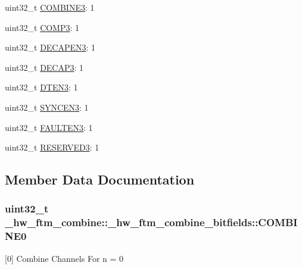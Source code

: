 \begin{DoxyCompactItemize}
\item 
uint32\+\_\+t \hyperlink{struct__hw__ftm__combine_1_1__hw__ftm__combine__bitfields_a5ec6bd45771c59a9f9bb562f11bf3e75}{C\+O\+M\+B\+I\+N\+E3}\+: 1
\item 
uint32\+\_\+t \hyperlink{struct__hw__ftm__combine_1_1__hw__ftm__combine__bitfields_ae94a98e3493de7cfb1be6da6527b76a0}{C\+O\+M\+P3}\+: 1
\item 
uint32\+\_\+t \hyperlink{struct__hw__ftm__combine_1_1__hw__ftm__combine__bitfields_accb4bd86bf26f5b787f232e03f7a7bb3}{D\+E\+C\+A\+P\+E\+N3}\+: 1
\item 
uint32\+\_\+t \hyperlink{struct__hw__ftm__combine_1_1__hw__ftm__combine__bitfields_a8ead0c5999abcf05f3fc9fdc95f898d0}{D\+E\+C\+A\+P3}\+: 1
\item 
uint32\+\_\+t \hyperlink{struct__hw__ftm__combine_1_1__hw__ftm__combine__bitfields_abf7cdd2c65b7f64361befa27da49ba68}{D\+T\+E\+N3}\+: 1
\item 
uint32\+\_\+t \hyperlink{struct__hw__ftm__combine_1_1__hw__ftm__combine__bitfields_ad383770c55624e4faa531626d3767dfd}{S\+Y\+N\+C\+E\+N3}\+: 1
\item 
uint32\+\_\+t \hyperlink{struct__hw__ftm__combine_1_1__hw__ftm__combine__bitfields_a42f20bfa286a3d73abd5773fc5965c01}{F\+A\+U\+L\+T\+E\+N3}\+: 1
\item 
uint32\+\_\+t \hyperlink{struct__hw__ftm__combine_1_1__hw__ftm__combine__bitfields_a5d722edad093deb33ff0a00149d282e8}{R\+E\+S\+E\+R\+V\+E\+D3}\+: 1
\end{DoxyCompactItemize}


\subsection{Member Data Documentation}
\subsubsection[{\texorpdfstring{C\+O\+M\+B\+I\+N\+E0}{COMBINE0}}]{\setlength{\rightskip}{0pt plus 5cm}uint32\+\_\+t \+\_\+hw\+\_\+ftm\+\_\+combine\+::\+\_\+hw\+\_\+ftm\+\_\+combine\+\_\+bitfields\+::\+C\+O\+M\+B\+I\+N\+E0}\hypertarget{struct__hw__ftm__combine_1_1__hw__ftm__combine__bitfields_a471184224c648c65209468fd3bc9fa43}{}\label{struct__hw__ftm__combine_1_1__hw__ftm__combine__bitfields_a471184224c648c65209468fd3bc9fa43}
\mbox{[}0\mbox{]} Combine Channels For n = 0 
